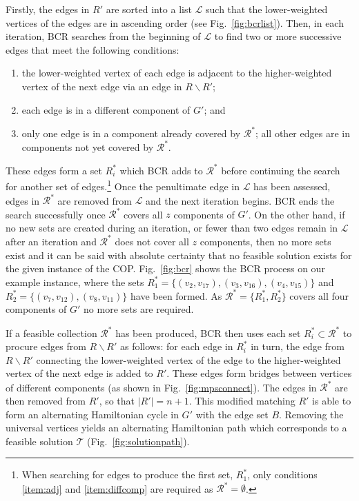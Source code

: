 \documentclass[authoryear]{elsarticle}
\begin{document}
Firstly, the edges in $R'$ are sorted into a list $\mathcal{L}$ such that the lower-weighted vertices of the edges are in ascending order (see Fig.~\ref{fig:bcrlist}). Then, in each iteration, BCR searches from the beginning of $\mathcal{L}$ to find two or more successive edges that meet the following conditions:
\begin{enumerate}[label={(\roman*)},itemsep=-2pt,topsep=2pt]
	\item the lower-weighted vertex of each edge is adjacent to the higher-weighted vertex of the next edge via an edge in $R\backslash R'$;\label{item:adj}
	\item each edge is in a different component of $G'$; \label{item:diffcomp} and
	\item only one edge is in a component already covered by $\mathcal{R}^*$; all other edges are in components not yet covered by $\mathcal{R}^*$.\label{item:overlap}
\end{enumerate} 
These edges form a set $R^*_i$ which BCR adds to $\mathcal{R}^*$ before continuing the search for another set of edges.\footnote{When searching for edges to produce the first set, $R^*_1$, only conditions \ref{item:adj} and \ref{item:diffcomp} are required as $\mathcal{R}^* = \emptyset$.} Once the penultimate edge in $\mathcal{L}$ has been assessed, edges in $\mathcal{R}^*$ are removed from $\mathcal{L}$ and the next iteration begins. BCR ends the search successfully once $\mathcal{R}^*$ covers all $z$ components of $G'$. On the other hand, if no new sets are created during an iteration, or fewer than two edges remain in $\mathcal{L}$ after an iteration and $\mathcal{R}^*$ does not cover all $z$ components, then no more sets exist and it can be said with absolute certainty that no feasible solution exists for the given instance of the COP. Fig.~\ref{fig:bcr} shows the BCR process on our example instance, where the sets $R^*_1 = \{(v_2, v_{17}),(v_3, v_{16}), (v_4, v_{15})\}$ and $R^*_2 = \{(v_7, v_{12}), (v_8, v_{11})\}$ have been formed. As $\mathcal{R}^* =\{R^*_1, R^*_2\}$ covers all four components of $G'$ no more sets are required.

If a feasible collection $\mathcal{R}^*$ has been produced, BCR then uses each set $R^*_i \subset \mathcal{R}^*$ to procure edges from $R\backslash R'$ as follows: for each edge in $R^*_i$ in turn, the edge from $R \backslash R'$ connecting the lower-weighted vertex of the edge to the higher-weighted vertex of the next edge is added to $R'$. These edges form bridges between vertices of different components (as shown in Fig.~\ref{fig:mpsconnect}). The edges in $\mathcal{R}^*$ are then removed from $R'$, so that $|R'| = n+1$. This modified matching $R'$ is able to form an alternating Hamiltonian cycle in $G'$ with the edge set $B$. Removing the universal vertices yields an alternating Hamiltonian path which corresponds to a feasible solution $\mathcal{T}$ (Fig.~\ref{fig:solutionpath}).
\end{document}
